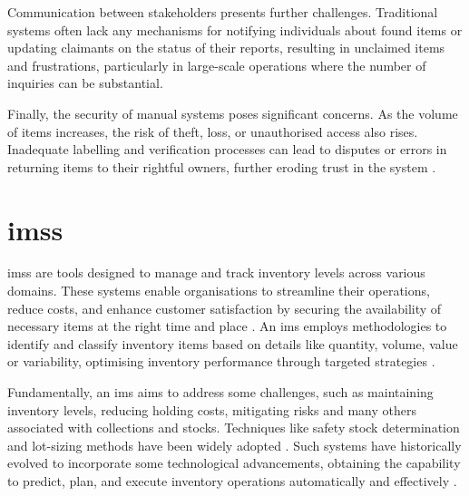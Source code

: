 Communication between stakeholders presents further challenges. Traditional systems often lack any mechanisms for notifying individuals about found items or updating claimants on the status of their reports, resulting in unclaimed items \cite{Zhou2023} and frustrations, particularly in large-scale operations where the number of inquiries can be substantial.

Finally, the security of manual systems poses significant concerns. As the volume of items increases, the risk of theft, loss, or unauthorised access also rises. Inadequate labelling and verification processes can lead to disputes or errors in returning items to their rightful owners, further eroding trust in the system \cite{Guinard2008}.



\section{\aclp{ims}} \label{sec:ims}

\acp{ims} are tools designed to manage and track inventory levels across various domains. These systems enable organisations to streamline their operations, reduce costs, and enhance customer satisfaction by securing the availability of necessary items at the right time and place \cite{Pauliina2024}. An \ac{ims} employs methodologies to identify and classify inventory items based on details like quantity, volume, value or variability, optimising inventory performance through targeted strategies \cite{Pauliina2024}.

Fundamentally, an \ac{ims} aims to address some challenges, such as maintaining inventory levels, reducing holding costs, mitigating risks and many others associated with collections and stocks. Techniques like safety stock determination and lot-sizing methods have been widely adopted \cite{Prabakaran2023}. Such systems have historically evolved to incorporate some technological advancements, obtaining the capability to predict, plan, and execute inventory operations automatically and effectively \cite{Chebet2019}.

